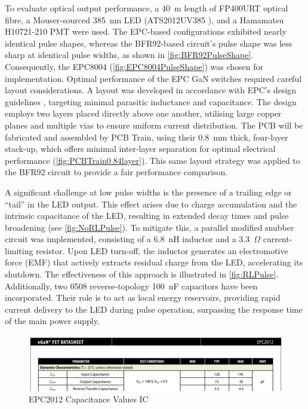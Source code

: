 \documentclass[a4paper,11pt]{article}
\begin{document}
To evaluate optical output performance, a 40~m length of FP400URT \cite{FP400URT} optical fibre, a Mouser-sourced 385~nm LED (ATS2012UV385 \cite{ATS2012UV385}), and a Hamamatsu H10721-210 \cite{H10721-210} PMT were used. The EPC-based configurations exhibited nearly identical pulse shapes, whereas the BFR92-based circuit's pulse shape was less sharp at identical pulse widths, as shown in \cref{fig:BFR92PulseShape}. Consequently, the EPC8004 (\cref{fig:EPC8004PulseShape}) was chosen for implementation. Optimal performance of the EPC GaN switches required careful layout considerations. A layout was developed in accordance with EPC's design guidelines \cite{EPCHSGuide}, targeting minimal parasitic inductance and capacitance. The design employs two layers placed directly above one another, utilising large copper planes and multiple vias to ensure uniform current distribution. The PCB will be fabricated and assembled by PCB Train, using their 0.8~mm thick, four-layer stack-up, which offers minimal inter-layer separation for optimal electrical performance (\cref{fig:PCBTrain0.84layer}). This same layout strategy was applied to the BFR92 circuit to provide a fair performance comparison.

A significant challenge at low pulse widths is the presence of a trailing edge or “tail” in the LED output. This effect arises due to charge accumulation and the intrinsic capacitance of the LED, resulting in extended decay times and pulse broadening (see \cref{fig:NoRLPulse}). To mitigate this, a parallel modified snubber circuit was implemented, consisting of a 6.8~nH inductor and a 3.3~$\Omega$ current-limiting resistor. Upon LED turn-off, the inductor generates an electromotive force (EMF) that actively extracts residual charge from the LED, accelerating its shutdown. The effectiveness of this approach is illustrated in \cref{fig:RLPulse}.
Additionally, two 0508 reverse-topology 100~nF capacitors have been incorporated. Their role is to act as local energy reservoirs, providing rapid current delivery to the LED during pulse operation, surpassing the response time of the main power supply.




\begin{figure}[htbp]
\centering
\includegraphics[scale=0.8]{EPC2012Cap.png}
\caption{EPC2012 Capacitance Values IC\label{fig:EPC2012Cap}}
\end{figure}
\end{document}
